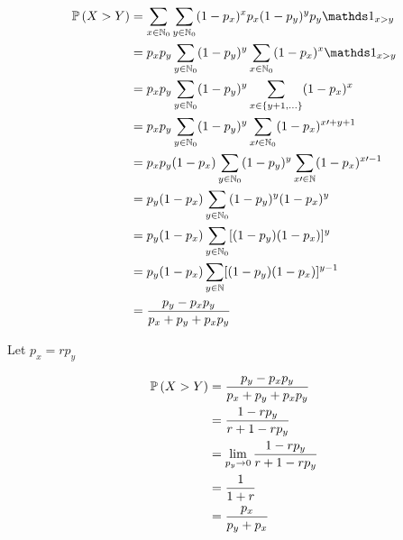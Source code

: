 \documentclass[12pt]{article}
\begin{document}


\begin{enumerate}


\begin{align*}
    \prob{X > Y} &= \sum_{x \in \naturals_0} \sum_{y \in \naturals_0} (1-p_x)^x p_x (1-p_y) ^y p_y \indic{x>y} \\ 
    &= p_xp_y \sum_{y \in \naturals_0} (1-p_y)^y  \sum_{x \in \naturals_0} (1-p_x)^x \indic{x>y} \\ 
    &= p_xp_y \sum_{y \in \naturals_0} (1-p_y)^y \sum_{x \in \braces{y+1, \ldots}} (1-p_x)^x \\ 
    &= p_xp_y \sum_{y \in \naturals_0} (1-p_y)^y \sum_{x\prime \in \naturals_0} (1-p_x)^{x\prime+y+1} \\
    &= p_xp_y(1-p_x) \sum_{y \in \naturals_0} (1-p_y)^y \sum_{x\prime \in \naturals} (1-p_x)^{x\prime-1} \\
    &= p_y(1-p_x) \sum_{y \in \naturals_0} (1-p_y)^y(1-p_x)^y \\ 
    &= p_y(1-p_x) \sum_{y \in \naturals_0} [(1-p_y)(1-p_x)]^y \\ 
    &= p_y(1-p_x) \sum_{y \in \naturals} [(1-p_y)(1-p_x)]^{y-1} \\ 
    &= \frac{p_y - p_xp_y}{p_x + p_y + p_xp_y}  
\end{align*}



Let $p_x = rp_y$ 

\begin{align*}
    \mathbb{P}\left(X > Y\right) &= \frac{p_y - p_xp_y}{p_x + p_y + p_xp_y} \\ 
    &= \frac{1-rp_y}{r+1-rp_y} \\ 
    &= \lim_{p_y \to 0} \frac{1-rp_y}{r+1-rp_y} \\
    &= \frac{1}{1+r} \\
    &= \frac{p_x}{p_y + p_x}
\end{align*}


\end{enumerate}
\end{document}
